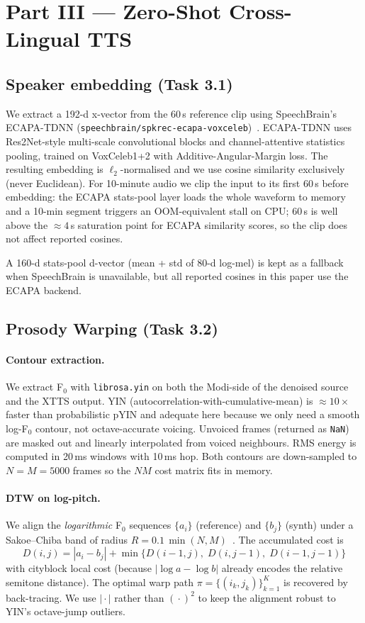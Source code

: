 \documentclass[conference]{IEEEtran}
\begin{document}
\section{Part III --- Zero-Shot Cross-Lingual TTS}

\subsection{Speaker embedding (Task 3.1)}
We extract a 192-d x-vector from the 60\,s reference clip using
SpeechBrain's ECAPA-TDNN
(\texttt{speechbrain/spkrec-ecapa-voxceleb})~\cite{desplanques}. ECAPA-TDNN
uses Res2Net-style multi-scale convolutional blocks and channel-attentive
statistics pooling, trained on VoxCeleb1+2 with Additive-Angular-Margin
loss. The resulting embedding is $\ell_2$-normalised and we use cosine
similarity exclusively (never Euclidean). For 10-minute audio we clip the
input to its first 60\,s before embedding: the ECAPA stats-pool layer
loads the whole waveform to memory and a 10-min segment triggers an
OOM-equivalent stall on CPU; 60\,s is well above the
$\approx 4$\,s saturation point for ECAPA similarity scores, so the clip
does not affect reported cosines.

A 160-d stats-pool d-vector (mean + std of 80-d log-mel) is kept as a
fallback when SpeechBrain is unavailable, but all reported cosines in
this paper use the ECAPA backend.

\subsection{Prosody Warping (Task 3.2)}

\paragraph*{Contour extraction.} We extract F$_{0}$ with
\texttt{librosa.yin} on both the Modi-side of the denoised source and the
XTTS output. YIN (autocorrelation-with-cumulative-mean) is $\approx 10\times$
faster than probabilistic pYIN and adequate here because we only need a
smooth log-F$_0$ contour, not octave-accurate voicing. Unvoiced frames
(returned as \texttt{NaN}) are masked out and linearly interpolated from
voiced neighbours. RMS energy is computed in 20\,ms windows with 10\,ms
hop. Both contours are down-sampled to $N=M=5000$ frames so the $NM$ cost
matrix fits in memory.

\paragraph*{DTW on log-pitch.} We align the \emph{logarithmic} F$_0$
sequences $\{a_i\}$ (reference) and $\{b_j\}$ (synth) under a
Sakoe--Chiba band of radius $R=0.1\,\min(N,M)$~\cite{sakoe1978}. The
accumulated cost is
\[
D(i,j) = |a_i - b_j| + \min\!\big\{D(i{-}1,j),\;D(i,j{-}1),\;D(i{-}1,j{-}1)\big\}
\]
with cityblock local cost (because $|\log a - \log b|$ already encodes
the relative semitone distance). The optimal warp path
$\pi=\{(i_k,j_k)\}_{k=1}^{K}$ is recovered by back-tracing. We use
$|\!\cdot\!|$ rather than $(\!\cdot\!)^2$ to keep the alignment robust to
YIN's octave-jump outliers.
\end{document}
